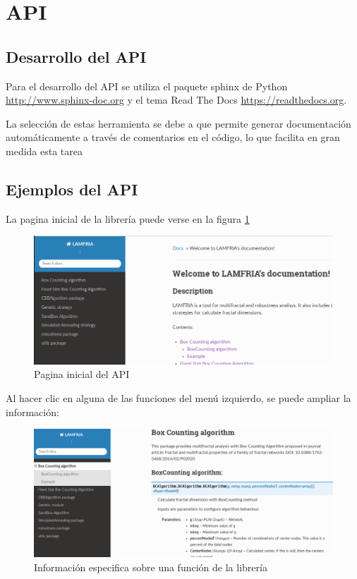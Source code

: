 \section{API}

\subsection{Desarrollo del API}

Para el desarrollo del API se utiliza el paquete sphinx de Python \url{http://www.sphinx-doc.org} y el tema Read The Docs \url{https://readthedocs.org}.

La selección de estas herramienta se debe a que permite generar documentación automáticamente a través de comentarios en el código, lo que facilita en gran medida esta tarea

\subsection{Ejemplos del API}

La pagina inicial de la librería puede verse en la figura  \ref{fig:lamfriaA}

\begin{figure}[H]
    \centering
    \includegraphics[scale=0.45]{Capitulo7Libreria/imagenes/lamfriaA.png}
    \caption{Pagina inicial del API}
    \label{fig:lamfriaA}
\end{figure}

Al hacer clic en alguna de las funciones del menú izquierdo, se puede ampliar la información:


\begin{figure}[H]
    \centering
    \includegraphics[scale=0.4]{Capitulo7Libreria/imagenes/lamfriaB.png}
    \caption{Información especifica sobre una función de la librería}
    \label{fig:lamfriaB}
\end{figure}

